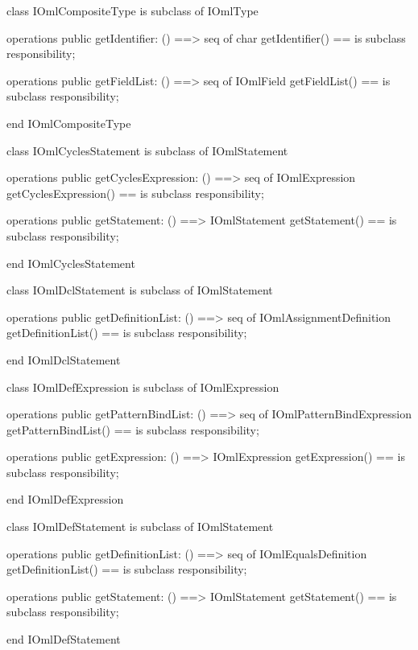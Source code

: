 \begin{vdm_al}
class IOmlCompositeType
 is subclass of IOmlType

operations
  public getIdentifier: () ==> seq of char
  getIdentifier() == is subclass responsibility;

operations
  public getFieldList: () ==> seq of IOmlField
  getFieldList() == is subclass responsibility;

end IOmlCompositeType
\end{vdm_al}

\begin{vdm_al}
class IOmlCyclesStatement
 is subclass of IOmlStatement

operations
  public getCyclesExpression: () ==> seq of IOmlExpression
  getCyclesExpression() == is subclass responsibility;

operations
  public getStatement: () ==> IOmlStatement
  getStatement() == is subclass responsibility;

end IOmlCyclesStatement
\end{vdm_al}

\begin{vdm_al}
class IOmlDclStatement
 is subclass of IOmlStatement

operations
  public getDefinitionList: () ==> seq of IOmlAssignmentDefinition
  getDefinitionList() == is subclass responsibility;

end IOmlDclStatement
\end{vdm_al}

\begin{vdm_al}
class IOmlDefExpression
 is subclass of IOmlExpression

operations
  public getPatternBindList: () ==> seq of IOmlPatternBindExpression
  getPatternBindList() == is subclass responsibility;

operations
  public getExpression: () ==> IOmlExpression
  getExpression() == is subclass responsibility;

end IOmlDefExpression
\end{vdm_al}

\begin{vdm_al}
class IOmlDefStatement
 is subclass of IOmlStatement

operations
  public getDefinitionList: () ==> seq of IOmlEqualsDefinition
  getDefinitionList() == is subclass responsibility;

operations
  public getStatement: () ==> IOmlStatement
  getStatement() == is subclass responsibility;

end IOmlDefStatement
\end{vdm_al}

